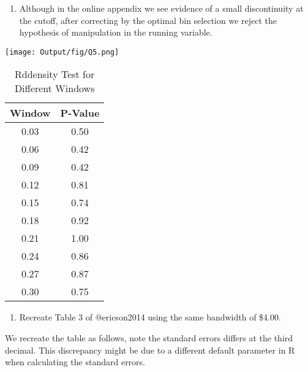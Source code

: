 \documentclass[
  12pt,
]{article}
\providecommand{\tightlist}{%
  \setlength{\itemsep}{0pt}\setlength{\parskip}{0pt}}
\begin{document}
\begin{enumerate}
\def\labelenumi{\arabic{enumi}.}
\setcounter{enumi}{4}
\tightlist
\item
  Although in the online appendix we see evidence of a small
  discontinuity at the cutoff, after correcting by the optimal bin
  selection we reject the hypothesis of manipulation in the running
  variable.
\end{enumerate}

\texttt{[image: Output/fig/Q5.png]}

  \begin{table}
  \caption{Rddensity Test for Different Windows}
  \centering
  \begin{tabular}[t]{cc}
  \toprule
  Window & P-Value\\
  \midrule
  0.03 & 0.50\\
  0.06 & 0.42\\
  0.09 & 0.42\\
  0.12 & 0.81\\
  0.15 & 0.74\\
  0.18 & 0.92\\
  0.21 & 1.00\\
  0.24 & 0.86\\
  0.27 & 0.87\\
  0.30 & 0.75\\
  \bottomrule
  \end{tabular}
  \end{table}

\newpage

\begin{enumerate}
\def\labelenumi{\arabic{enumi}.}
\tightlist
\item
  Recreate Table 3 of @ericson2014 using the same bandwidth of
  \$4.00.\newline
\end{enumerate}

We recreate the table as follows, note the standard errors differs at
the third decimal. This discrepancy might be due to a different default
parameter in R when calculating the standard errors.
\end{document}
